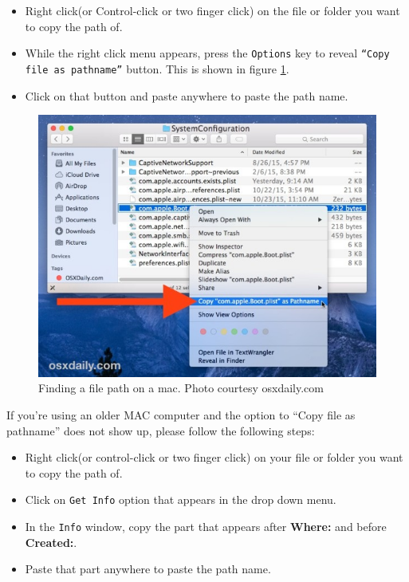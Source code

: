 \documentclass[]{article}
\begin{document}
\begin{itemize}
	\item Right click(or Control-click or two finger click) on the file or folder you want to copy the path of.
	\item While the right click menu appears, press the \texttt{Options} key to reveal \texttt{``Copy file as pathname''} button. This is shown in figure \ref{fig:filepathmac}.
	\item Click on that button and paste anywhere to paste the path name.
\end{itemize}
\begin{figure}[H]
	\centering
	\includegraphics[width=0.7\linewidth]{../img/filepathmac}
	\caption{Finding a file path on a mac. Photo courtesy osxdaily.com}
	\label{fig:filepathmac}
\end{figure}

If you're using an older MAC computer and the option to ``Copy file as pathname'' does not show up, please follow  the following steps:

\begin{itemize}
	\item Right click(or control-click or two finger click) on your file or folder you want to copy the path of.
	\item Click on \texttt{Get Info} option that appears in the drop down menu.
	\item In the \texttt{Info} window, copy the part that appears after \textbf{Where:} and before \textbf{Created:}.
	\item Paste that part anywhere to paste the path name. 
\end{itemize}
\end{document}
